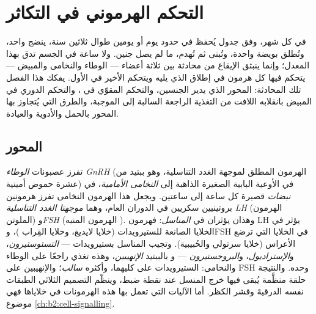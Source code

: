 \chapter{التحكم الهرموني في التكاثر}\label{ch:b2:reproductive-hormones}

في كل شهر، وفق جدول يُحفظ في حدود يوم أو يومين طوال ثلاثين
سنة، ينضج  واحد، وتُطلق بويضة واحدة، وتُبنى  ثم تُهدم، ما لم يصل جنين. ولا ساعة في الجسم تدق
بهذا المعدل؛ وإنما ينبثق الإيقاع من محادثة بين ثلاثة أعضاء ---
الوطاء والنخامى والمبيض --- يتحكم فيها كل هرمون في
إطلاق الذي يليه ويتحكم الأخير في الأول. يفكك هذا الفصل
تلك المحادثة: المحور الذي يدير الجنسين، والتحكم المقوّي في ،
والتحكم الدوري في المبيض بانقلابه اللافت من التغذية الراجعة السالبة
إلى الموجبة، والطرق التي يُتجاوز بها المحور بالحمل والأدوية
والعيادة.

\section{المحور}

\begin{definition}\label{def:b2:reproductive-hormones:axis}
تفرز عصبونات \emph{الوطاء} \emph{GnRH}
(الهرمون المطلق لموجهة الغدد التناسلية، وهو ببتيد من عشرة حموض أمينية) في
الأوعية البابية الصغيرة الذاهبة إلى \emph{النخامى الأمامية}،
في \emph{نبضات} قصيرة كل ساعة إلى ساعتين. ويجعل هذا الهرمون
النخامى تفرز هرمونين بروتينيين سكريين في الدوران
العام، وهما \emph{موجهتا الغدد التناسلية} \emph{LH} (الهرمون
الملوتن) و\emph{FSH} (الهرمون المنبه ). وهذان يؤثران في
\emph{المناسل}: فهرمون LH يؤثر في الخلايا الصانعة للستيرويدات (خلايا لايديغ،
وخلايا القِراب )، وFSH في الخلايا التي ترضع الأعراس
(خلايا سرتولي والحُبيبية). وتجيب المناسل بستيرويدات ---
\emph{التستوستيرون}، و\emph{الإستراديول}، و\emph{البروجستيرون} --- و
بالببتيد \emph{الإنهيبين}، وهذه تغذي راجعًا على
الوطاء والنخامى: الستيرويدات على كليهما، وأكثره
\emph{سالب}؛ والإنهيبين على FSH وحده. والنتيجة حلقة
منظَّمة يُبقى فيها خرج المنسل عند نقطة ضبط، وينظّم
التصميم الثلاثي الطبقات نفسه الدرقيةَ وقشر الكظر. أما
الآليات التي تعمل بها هذه الهرمونات في خلاياها فهي موضوع
\cref{ch:b2:cell-signalling}.
\end{definition}

